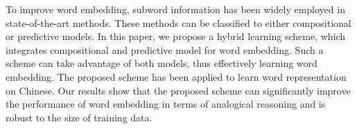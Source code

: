 To improve word embedding, subword information has been widely employed in state-of-the-art methods. These methods can be classified to either compositional or predictive models. In this paper, we propose a hybrid learning scheme, which integrates compositional and predictive model for word embedding. Such a scheme can take advantage of both models, thus effectively learning word embedding. The proposed scheme has been applied to learn word representation on Chinese. Our results show that the proposed scheme can significantly improve the performance of word embedding in terms of analogical reasoning and is robust to the size of training data.
